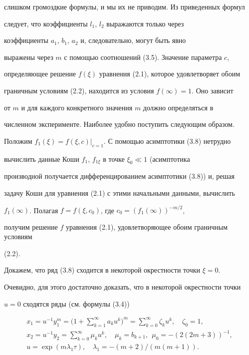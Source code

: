 слишком громоздкие формулы, и мы их не приводим. Из приведенных формул 


следует, что коэффициенты $l_1$, $l_2$ выражаются только через 


коэффициенты $a_1$, $b_1$, $a_2$ и, следовательно, могут быть явно 


выражены через $m$ с помощью соотношений (3.5). Значение параметра $c$, 


определяющее решение $f(\xi)$ уравнения (2.1), которое удовлетворяет обоим 


граничным условиям (2.2), находится из условия $f(\infty)=1$. Оно зависит 


от $m$ и для каждого конкретного значения $m$ должно определяться в 


численном эксперименте. Наиболее удобно поступить следующим образом. 


Положим $f_1(\xi)=f(\xi,c)|_{c=1}$. С помощью асимптотики (3.8) нетрудно 


вычислить данные Коши $f_1$, $f_{1\xi}$ в точке $\xi_0\ll1$ (асимптотика 


производной получается дифференцированием асимптотики (3.8)) и, решая 


задачу Коши для уравнения (2.1) с этими начальными данными, вычислить 


$f_1(\infty)$. Полагая $f=f(\xi,c_0)$, где $c_0=(f_1(\infty))^{-m/2}$, 


получим решение $f$ уравнения (2.1), удовлетворяющее обоим граничным условиям 


(2.2). 


 


Докажем, что ряд (3.8) сходится в некоторой окрестности точки $\xi=0$. 


Очевидно, для этого достаточно доказать, что в некоторой окрестности точки 


$u=0$ сходятся ряды (см. формулы (3.4)) 


\begin{gather*} 


x_1=u^{-1}y^m_1=\bigg(1+\sum^\infty_{k=1}a_k u^k\bigg)^m= 


\sum^\infty_{k=0}\zeta_k u^k,\quad \zeta_0=1,\\ 


x_2=u^{-1}y_2=\sum^\infty_{k=0}\mu_k u^k,\quad 


\mu_k=b_{k+1},\ \ \mu_0=-(2(2m+3))^{-1},\\ 


u=\exp(m\lambda_1\tau),\quad \lambda_1=-(m+2)/(m(m+1)). 


\end{gather*} 


